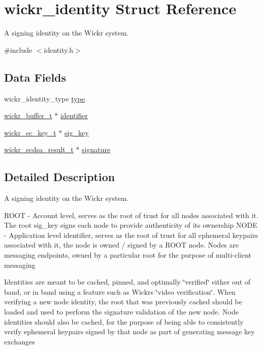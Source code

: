 \hypertarget{structwickr__identity}{}\section{wickr\+\_\+identity Struct Reference}
\label{structwickr__identity}


A signing identity on the Wickr system.  




{\ttfamily \#include $<$identity.\+h$>$}

\subsection*{Data Fields}
\begin{DoxyCompactItemize}
\item 
wickr\+\_\+identity\+\_\+type \hyperlink{structwickr__identity_a685dae977849c05c84ee4a0b10c9396d}{type}
\item 
\hyperlink{structwickr__buffer}{wickr\+\_\+buffer\+\_\+t} $\ast$ \hyperlink{structwickr__identity_aed3657b22d83bb810b51ea1d1520b23e}{identifier}
\item 
\hyperlink{structwickr__ec__key}{wickr\+\_\+ec\+\_\+key\+\_\+t} $\ast$ \hyperlink{structwickr__identity_a788a08ac03576cb76d9b2eaf81a7af3e}{sig\+\_\+key}
\item 
\hyperlink{structwickr__ecdsa__result}{wickr\+\_\+ecdsa\+\_\+result\+\_\+t} $\ast$ \hyperlink{structwickr__identity_afb6bd9f5f9707be10fb273ce8d0b5928}{signature}
\end{DoxyCompactItemize}


\subsection{Detailed Description}
A signing identity on the Wickr system. 

R\+O\+OT -\/ Account level, serves as the root of trust for all nodes associated with it. The root sig\+\_\+key signs each node to provide authenticity of its ownership N\+O\+DE -\/ Application level identifier, serves as the root of trust for all ephemeral keypairs associated with it, the node is owned / signed by a R\+O\+OT node. Nodes are messaging endpoints, owned by a particular root for the purpose of multi-\/client messaging

Identities are meant to be cached, pinned, and optimally \char`\"{}verified\char`\"{} either out of band, or in band using a feature such as Wickr\textquotesingle{}s \char`\"{}video verification\char`\"{}. When verifying a new node identity, the root that was previously cached should be loaded and used to perform the signature validation of the new node. Node identities should also be cached, for the purpose of being able to consistently verify ephemeral keypairs signed by that node as part of generating message key exchanges 

